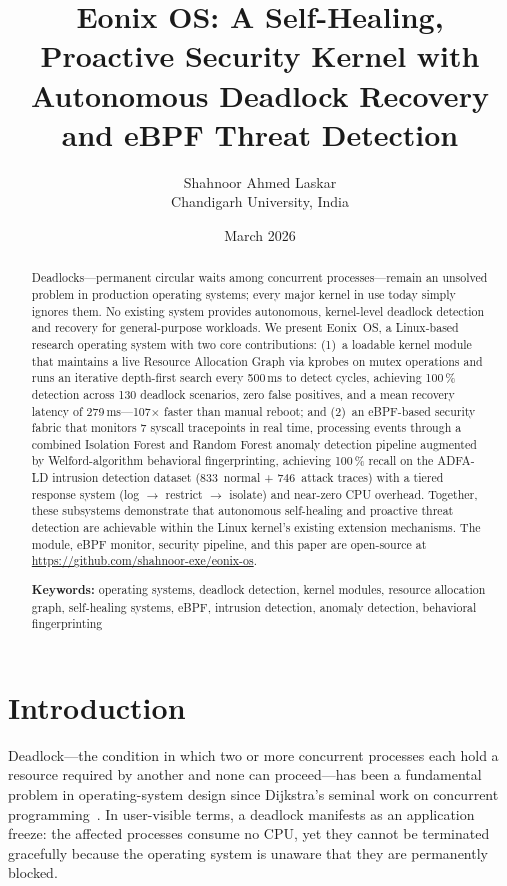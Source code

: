 \documentclass[11pt,letterpaper]{article}
\title{Eonix OS: A Self-Healing, Proactive Security Kernel with\\Autonomous Deadlock Recovery and eBPF Threat Detection}
\author{Shahnoor Ahmed Laskar\\Chandigarh University, India}
\date{March 2026}
\begin{document}
\maketitle

\begin{abstract}
Deadlocks---permanent circular waits among concurrent processes---remain
an unsolved problem in production operating systems; every major kernel
in use today simply ignores them.  No existing system provides
autonomous, kernel-level deadlock detection and recovery for
general-purpose workloads.  We present Eonix~OS, a Linux-based research
operating system with two core contributions: (1)~a loadable kernel
module that maintains a live Resource Allocation Graph via kprobes on
mutex operations and runs an iterative depth-first search every 500\,ms
to detect cycles, achieving 100\,\% detection across 130 deadlock
scenarios, zero false positives, and a mean recovery latency of
279\,ms---107$\times$ faster than manual reboot; and (2)~an eBPF-based
security fabric that monitors 7 syscall tracepoints in real time,
processing events through a combined Isolation Forest and Random Forest
anomaly detection pipeline augmented by Welford-algorithm behavioral
fingerprinting, achieving 100\,\% recall on the ADFA-LD intrusion
detection dataset (833~normal + 746~attack traces) with a tiered
response system (log $\to$ restrict $\to$ isolate) and near-zero CPU
overhead.  Together, these subsystems demonstrate that autonomous
self-healing and proactive threat detection are achievable within the
Linux kernel's existing extension mechanisms.  The module, eBPF monitor,
security pipeline, and this paper are open-source at
\url{https://github.com/shahnoor-exe/eonix-os}.

\medskip\noindent\textbf{Keywords:} operating systems, deadlock detection, kernel
modules, resource allocation graph, self-healing systems, eBPF,
intrusion detection, anomaly detection, behavioral fingerprinting
\end{abstract}

\section{Introduction}

Deadlock---the condition in which two or more concurrent processes each
hold a resource required by another and none can proceed---has been a
fundamental problem in operating-system design since Dijkstra's seminal
work on concurrent programming~\cite{dijkstra1968}.  In user-visible
terms, a deadlock manifests as an application freeze: the affected
processes consume no CPU, yet they cannot be terminated gracefully
because the operating system is unaware that they are permanently
blocked.
\end{document}

